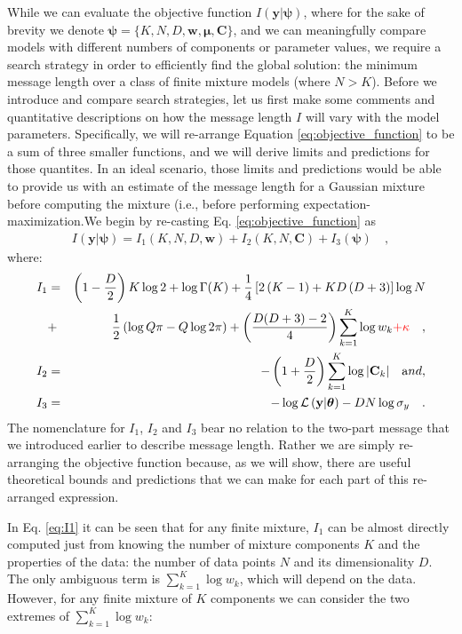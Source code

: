 \documentclass{elsarticle}
\newcommand{\todo}[1]{\textcolor{red}{#1}}
\newcommand{\vect}[1]{\boldsymbol{\mathbf{#1}}}
\renewcommand{\vec}[1]{\vect{#1}}
\def\cov{C}
\def\veccov{\vect{\cov}}
\def\vecmean{\vect{\mu}}
\def\weight{w}
\def\datum{y}
\def\data{\vect{\datum}}
\def\likelihood{\mathcal{L}}
\begin{document}
While we can evaluate the objective function $I(\vec{\data}|\vec{\psi})$, 
where for the sake of brevity we denote $\vec{\psi} = \{K, N, D, \vec{\weight}, 
\vecmean, \veccov\}$, and we can meaningfully compare models with different 
numbers of components or parameter values, we require a search strategy in 
order to efficiently find the global solution: the minimum message length 
over a class of finite mixture models (where $N > K$). Before we introduce and 
compare search strategies, let us first make some comments and quantitative 
descriptions on how the message length $I$ will vary with the model parameters. 
Specifically, we will re-arrange Equation \ref{eq:objective_function} to be a 
sum of three smaller functions, and we will derive limits and predictions for 
those quantites. In an ideal scenario, those limits and predictions would be 
able to provide us with an estimate of the message length for a Gaussian 
mixture before computing the mixture (i.e., before performing 
expectation-maximization.We begin by re-casting Eq. \ref{eq:objective_function} 
as
\begin{eqnarray}
I(\vec{\data}|\vec{\psi}) = I_{1}(K, N, D, \vec{\weight}) 
                          + I_{2}(K, N, \veccov)
                          + I_{3}(\vec{\psi}) \quad ,
\end{eqnarray}
\noindent{}where:
\begin{eqnarray}
    I_{1} &=& \left(1-\frac{D}{2}\right)K\log{2} + \log{\Gamma(K)} + \frac{1}{4}\left[2\left(K - 1\right) + KD\left(D+3\right)\right]\log{N} \nonumber \\
          &+& \frac{1}{2}\left(\log{Q\pi} - Q\log{2\pi}\right) + \left(\frac{D(D+3) - 2}{4}\right)\sum_{k=1}^{K}\log{\weight_k} \todo{+ \kappa} \quad , \label{eq:I1} \\
    I_{2} &=& -\left(1 + \frac{D}{2}\right)\sum_{k=1}^{K}\log{|\veccov_k|} \quad {\textrm and},\\
    I_{3} &=& -\log\likelihood\left(\vec{\data}|\vec{\theta}\right) - DN\log{\sigma_{\datum}} \quad .
\end{eqnarray}
The nomenclature for $I_1$, $I_2$ and $I_3$ bear no relation to the two-part 
message that we introduced earlier to describe message length. Rather we are
simply re-arranging the objective function because, as we will show, there are
useful theoretical bounds and predictions that we can make for each part of
this re-arranged expression.

In Eq. \ref{eq:I1} it can be seen that for any finite mixture, $I_1$ can be
almost directly computed just from knowing the number of mixture components
$K$ and the properties of the data: the number of data points $N$ and its
dimensionality $D$. The only ambiguous term is $\sum_{k=1}^{K}\log\weight_k$,
which will depend on the data. However, for any finite mixture of $K$
components we can consider the two extremes of $\sum_{k=1}^{K}\log\weight_k$:
\end{document}
